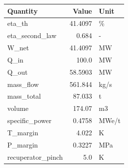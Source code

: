 \begin{tabular}{@{}lrl@{}}
\toprule
Quantity & Value & Unit \\
\midrule
eta\_th & 41.4097 & \% \\
eta\_second\_law & 0.684 & - \\
W\_net & 41.4097 & MW \\
Q\_in & 100.0 & MW \\
Q\_out & 58.5903 & MW \\
mass\_flow & 561.844 & kg/s \\
mass\_total & 87.033 & t \\
volume & 174.07 & m3 \\
specific\_power & 0.4758 & MWe/t \\
T\_margin & 4.022 & K \\
P\_margin & 0.3227 & MPa \\
recuperator\_pinch & 5.0 & K \\
\bottomrule
\end{tabular}
